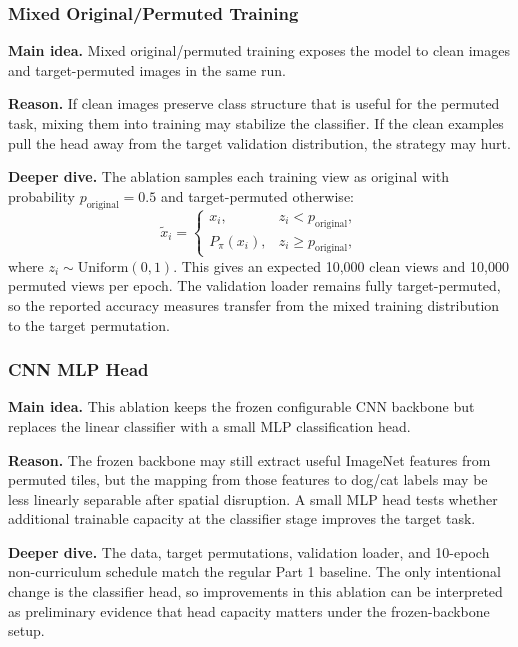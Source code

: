 \documentclass[12pt]{article}
\begin{document}
\subsubsection{Mixed Original/Permuted Training}

\textbf{Main idea.} Mixed original/permuted training exposes the model to clean images and target-permuted images in the same run.

\textbf{Reason.} If clean images preserve class structure that is useful for the permuted task, mixing them into training may stabilize the classifier. If the clean examples pull the head away from the target validation distribution, the strategy may hurt.

\textbf{Deeper dive.} The ablation samples each training view as original with probability $p_{\mathrm{original}}=0.5$ and target-permuted otherwise:
\[
  \tilde{x}_i =
  \begin{cases}
    x_i, & z_i < p_{\mathrm{original}},\\
    P_{\pi}(x_i), & z_i \ge p_{\mathrm{original}},
  \end{cases}
\]
where $z_i \sim \mathrm{Uniform}(0,1)$.
This gives an expected 10,000 clean views and 10,000 permuted views per epoch. The validation loader remains fully target-permuted, so the reported accuracy measures transfer from the mixed training distribution to the target permutation.

\subsubsection{CNN MLP Head}

\textbf{Main idea.} This ablation keeps the frozen configurable CNN backbone but replaces the linear classifier with a small MLP classification head.

\textbf{Reason.} The frozen backbone may still extract useful ImageNet features from permuted tiles, but the mapping from those features to dog/cat labels may be less linearly separable after spatial disruption. A small MLP head tests whether additional trainable capacity at the classifier stage improves the target task.

\textbf{Deeper dive.} The data, target permutations, validation loader, and 10-epoch non-curriculum schedule match the regular Part 1 baseline. The only intentional change is the classifier head, so improvements in this ablation can be interpreted as preliminary evidence that head capacity matters under the frozen-backbone setup.
\end{document}
